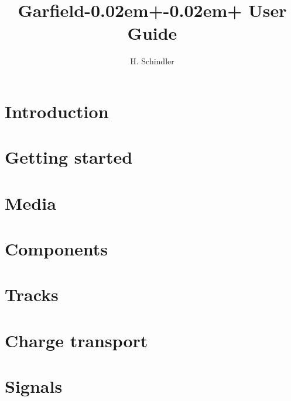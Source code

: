 \documentclass[11pt, a4paper, twoside]{scrreprt}
\title{Garfield\kern-0.02em+\kern-0.02em+ User Guide}
\author{H. Schindler}
\begin{document}

\cleardoublepage
\tableofcontents
\cleardoublepage

\chapter{Introduction}
  

\chapter{Getting started}\label{Chap:Installation}
  
\lstset{language=C++}
  

\chapter{Media}\label{Chap:Media}
  

\chapter{Components}\label{Chap:Components}
  

\chapter{Tracks}\label{Chap:Tracks}
  

\chapter{Charge transport}\label{Chap:Transport}
  

\chapter{Signals}\label{Chap:Signals}
  



\cleardoublepage
{}


\end{document}
